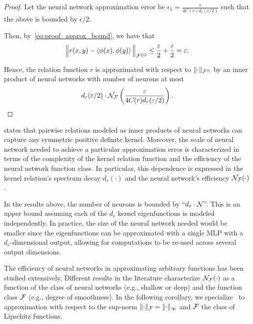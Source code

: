 \begin{proof}
	Let the neural network approximation error be $\epsilon_1 = \frac{\epsilon}{4 C(r) d_r(\epsilon / 2)}$ such that the above is bounded by $\epsilon / 2$. 

	Then, by~\eqref{eq:proof_approx_bound}, we have that
	\begin{equation*}
			\bignorm{r(x,y) - \iprod{\phi(x)}{\phi(y)}}_{\calF^{\otimes 2}} \leq \frac{\epsilon}{2} + \frac{\epsilon}{2} = \epsilon.
	\end{equation*}

	Hence, the relation function $r$ is approximated with respect to $\lVert\cdot\rVert_{{\mathcal{F}}^{\otimes}}$ by an inner product of neural networks with number of neurons at most 
	\[d_r(\varepsilon / 2) \cdot {\mathcal{N}}_{\mathcal{F}}\left(\frac{\varepsilon}{4 C(r) d_r(\varepsilon / 2)}\right).\]

\end{proof}

 states that pairwise relations modeled as inner products of neural networks can capture any symmetric positive definite kernel. Moreover, the scale of neural network needed to achieve a particular approximation error is characterized in terms of the complexity of the kernel relation function and the efficiency of the neural network function class. In particular, this dependence is expressed in the kernel relation's spectrum decay $d_r(\cdot)$ and the neural network's efficiency ${\mathcal{N}}_{\mathcal{F}}(\cdot)$.

\begin{remark}
	In the results above, the number of neurons is bounded by ``$d_r \cdot {\mathcal{N}}$''. This is an upper bound assuming each of the $d_r$ kernel eigenfunctions is modeled independently. In practice, the size of the neural network needed would be smaller since the eigenfunctions can be approximated with a single MLP with a $d_r$-dimensional output, allowing for computations to be re-used across several output dimensions.
\end{remark}

The efficiency of neural networks in approximating arbitrary functions has been studied extensively. Different results in the literature characterize ${\mathcal{N}}_{{\mathcal{F}}}(\cdot)$ as a function of the class of neural networks (e.g., shallow or deep) and the function class ${\mathcal{F}}$ (e.g., degree of smoothness). In the following corollary, we specialize~ to approximation with respect to the sup-norm $\lVert\cdot\rVert_{\mathcal{F}} = \lVert\cdot\rVert_\infty$ and ${\mathcal{F}}$ the class of Lipschitz functions.

